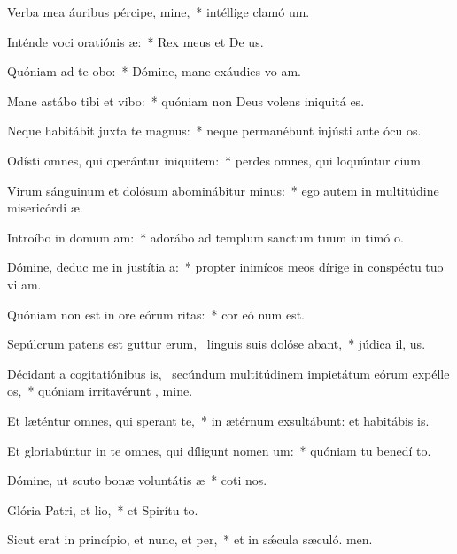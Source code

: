 \item Verba mea áuribus pércipe, mine,~* intéllige clamó um.
\item Inténde voci oratiónis æ:~* Rex meus et De us.
\item Quóniam ad te obo:~* Dómine, mane exáudies vo am.
\item Mane astábo tibi et vibo:~* quóniam non Deus volens iniquitá  es.
\item Neque habitábit juxta te magnus:~* neque permanébunt injústi ante ócu os.
\item Odísti omnes, qui operántur iniquitem:~* perdes omnes, qui loquúntur cium.
\item Virum sánguinum et dolósum abominábitur minus:~* ego autem in multitúdine misericórdi æ.
\item Introíbo in domum am:~* adorábo ad templum sanctum tuum in timó o.
\item Dómine, deduc me in justítia a:~* propter inimícos meos dírige in conspéctu tuo vi am.
\item Quóniam non est in ore eórum ritas:~* cor eó num est.
\item Sepúlcrum patens est guttur erum,~\pscross{} linguis suis dolóse abant,~* júdica il, us.
\item Décidant a cogitatiónibus is,~\pscross{} secúndum multitúdinem impietátum eórum expélle os,~* quóniam irritavérunt , mine.
\item Et læténtur omnes, qui sperant  te,~* in ætérnum exsultábunt: et habitábis  is.
\item Et gloriabúntur in te omnes, qui díligunt nomen um:~* quóniam tu benedí to.
\item Dómine, ut scuto bonæ voluntátis æ~* coti nos.
\item Glória Patri, et lio,~* et Spirítu to.
\item Sicut erat in princípio, et nunc, et per,~* et in sǽcula sæculó. men.
